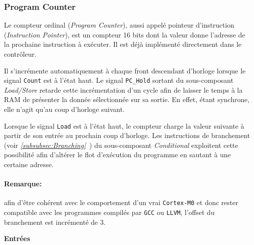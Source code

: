 \documentclass{article}
\begin{document}
    \subsubsection{Program Counter}


    Le compteur ordinal (\textit{Program Counter}), aussi appelé pointeur d'instruction (\textit{Instruction Pointer}),
    est un compteur 16 bits dont la valeur donne l'adresse de la prochaine instruction à exécuter.
    Il est déjà implémenté directement dans le contrôleur.

    Il s'incrémente automatiquement à chaque front descendant d'horloge lorsque le signal \texttt{Count} est à l'état haut.
    Le signal \texttt{PC\_Hold} sortant du sous-composant \textit{Load/Store} retarde cette incrémentation d'un cycle afin de laisser le temps à la RAM de présenter la donnée sélectionnée sur sa sortie.
    En effet, étant synchrone, elle n'agit qu'au coup d'horloge suivant.

    Lorsque le signal \texttt{Load} est à l'état haut, le compteur charge la valeur suivante à partir de son entrée au prochain coup d'horloge.
    Les instructions de branchement (voir \textit{\ref{subsubsec:Branching}~}) du sous-composant \textit{Conditional} exploitent cette possibilité
    afin d'altérer le flot d'exécution du programme en sautant à une certaine adresse.

    \paragraph{Remarque:} afin d'être cohérent avec le comportement d'un vrai \texttt{Cortex-M0} et donc rester compatible avec les programmes compilés par \texttt{GCC} ou \texttt{LLVM},
    l'offset du branchement est incrémenté de 3.


    \textbf{Entrées}\\
\end{document}
